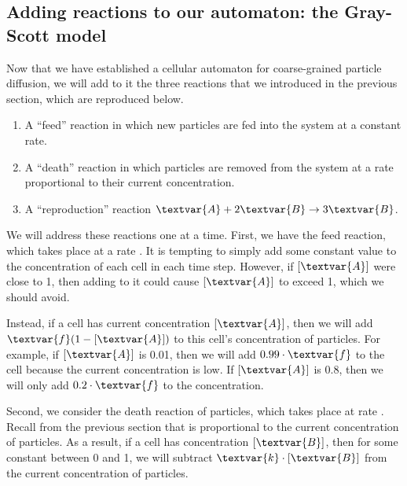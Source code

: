 \FloatBarrier
{}
\subsection{Adding reactions to our automaton: the Gray-Scott model}

Now that we have established a cellular automaton for coarse-grained particle diffusion, we will add to it the three reactions that we introduced in the previous section, which are reproduced below.

\begin{enumerate}
\item A ``feed'' reaction in which new  particles are fed into the system at a constant rate.
\item A ``death'' reaction in which  particles are removed from the system at a rate proportional to their current concentration.
\item A ``reproduction'' reaction $\textvar{A} + 2\textvar{B} \rightarrow 3\textvar{B}$.
\end{enumerate}

\begin{qbox}\end{qbox}

We will address these reactions one at a time. First, we have the feed reaction, which takes place at a rate . It is tempting to simply add some constant value  to the concentration of each cell in each time step. However, if $[\textvar{A}]$ were close to 1, then adding  to it could cause $[\textvar{A}]$ to exceed 1, which we should avoid.

Instead, if a cell has current concentration $[\textvar{A}]$, then we will add $\textvar{f}(1-[\textvar{A}])$ to this cell's concentration of  particles. For example, if $[\textvar{A}]$ is 0.01, then we will add $0.99 \cdot \textvar{f}$ to the cell because the current concentration is low. If $[\textvar{A}]$ is 0.8, then we will only add $0.2 \cdot \textvar{f}$ to the concentration.

Second, we consider the death reaction of  particles, which takes place at rate . Recall from the previous section that  is proportional to the current concentration of  particles. As a result, if a cell has concentration $[\textvar{B}]$, then for some constant  between 0 and 1, we will subtract $\textvar{k} \cdot [\textvar{B}]$ from the current concentration of  particles.

